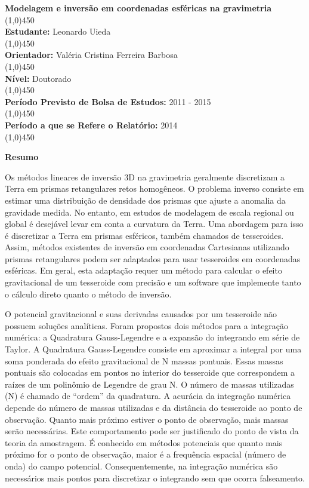 \documentclass[12pt]{letter}
\begin{document}
\thispagestyle{fancy}

\begin{flushleft}
\textbf{Modelagem e inversão em coordenadas esféricas na gravimetria}\\
\line(1,0){450}
\\\textbf{Estudante:} Leonardo Uieda\\
\line(1,0){450}
\\\textbf{Orientador:} Valéria Cristina Ferreira Barbosa\\
\line(1,0){450}
\\\textbf{Nível:} Doutorado\\
\line(1,0){450}
\\\textbf{Período Previsto de Bolsa de Estudos:} 2011 - 2015\\
\line(1,0){450}
\\\textbf{Período a que se Refere o Relatório:} 2014\\
\line(1,0){450}
\end{flushleft}

\textbf{Resumo}

Os métodos lineares de inversão 3D na gravimetria
geralmente discretizam a Terra
em prismas retangulares retos homogêneos.
O problema inverso consiste
em estimar uma distribuição de densidade dos prismas
que ajuste a anomalia da gravidade medida.
No entanto,
em estudos de modelagem
de escala regional ou global
é desejável levar em conta
a curvatura da Terra.
Uma abordagem para isso
é discretizar a Terra em prismas esféricos,
também chamados de tesseroides.
Assim,
métodos existentes de inversão
em coordenadas Cartesianas
utilizando prismas retangulares
podem ser adaptados
para usar tesseroides
em coordenadas esféricas.
Em geral,
esta adaptação requer
um método para calcular
o efeito gravitacional de um tesseroide
com precisão
e um software que implemente
tanto o cálculo direto
quanto o método de inversão.

O potencial gravitacional e suas derivadas
causados por um tesseroide
não possuem soluções analíticas.
Foram propostos dois métodos para a integração numérica:
a Quadratura Gauss-Legendre
e a expansão do integrando em série de Taylor.
A Quadratura Gauss-Legendre
consiste em aproximar a integral
por uma soma ponderada
do efeito gravitacional de N massas pontuais.
Essas massas pontuais
são colocadas em pontos
no interior do tesseroide
que correspondem a raízes
de um polinômio de Legendre de grau N.
O número de massas utilizadas (N)
é chamado de ``ordem'' da quadratura.
A acurácia da integração numérica
depende do número de massas utilizadas
e da distância do tesseroide ao ponto de observação.
Quanto mais próximo estiver o ponto de observação,
mais massas serão necessárias.
Este comportamento
pode ser justificado
do ponto de vista da teoria da amostragem.
É conhecido em métodos potenciais
que quanto mais próximo for o ponto de observação,
maior é a frequência espacial (número de onda)
do campo potencial.
Consequentemente,
na integração numérica são necessários
mais pontos para discretizar o integrando
sem que ocorra falseamento.
\end{document}
